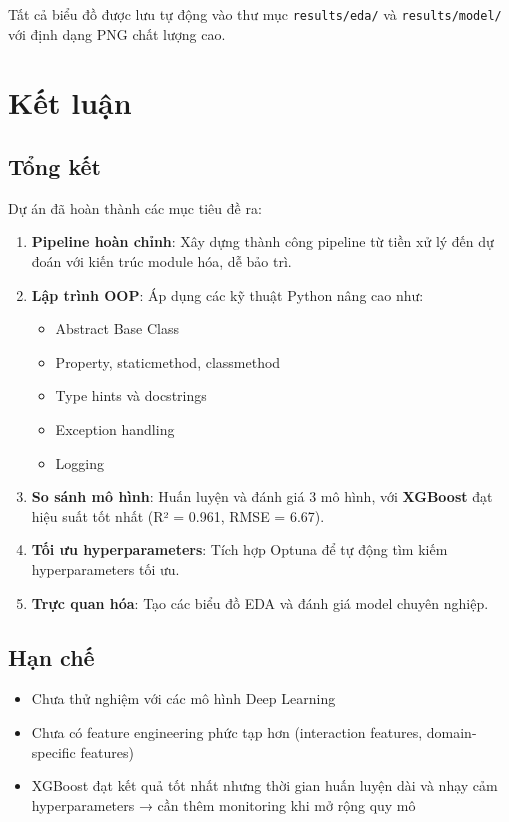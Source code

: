 \documentclass[12pt,a4paper]{article}
\begin{document}
Tất cả biểu đồ được lưu tự động vào thư mục \texttt{results/eda/} và \texttt{results/model/} với định dạng PNG chất lượng cao.

\section{Kết luận}

\subsection{Tổng kết}

Dự án đã hoàn thành các mục tiêu đề ra:

\begin{enumerate}
    \item \textbf{Pipeline hoàn chỉnh}: Xây dựng thành công pipeline từ tiền xử lý đến dự đoán với kiến trúc module hóa, dễ bảo trì.
    
    \item \textbf{Lập trình OOP}: Áp dụng các kỹ thuật Python nâng cao như:
    \begin{itemize}
        \item Abstract Base Class
        \item Property, staticmethod, classmethod
        \item Type hints và docstrings
        \item Exception handling
        \item Logging
    \end{itemize}
    
    \item \textbf{So sánh mô hình}: Huấn luyện và đánh giá 3 mô hình, với \textbf{XGBoost} đạt hiệu suất tốt nhất (R² = 0.961, RMSE = 6.67).
    
    \item \textbf{Tối ưu hyperparameters}: Tích hợp Optuna để tự động tìm kiếm hyperparameters tối ưu.
    
    \item \textbf{Trực quan hóa}: Tạo các biểu đồ EDA và đánh giá model chuyên nghiệp.
\end{enumerate}

\subsection{Hạn chế}

\begin{itemize}
    \item Chưa thử nghiệm với các mô hình Deep Learning
    \item Chưa có feature engineering phức tạp hơn (interaction features, domain-specific features)
    \item XGBoost đạt kết quả tốt nhất nhưng thời gian huấn luyện dài và nhạy cảm hyperparameters → cần thêm monitoring khi mở rộng quy mô
\end{itemize}
\end{document}

